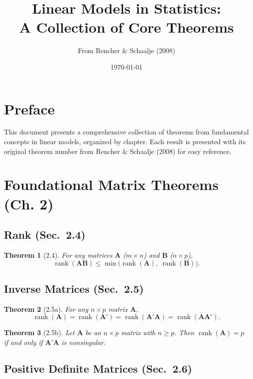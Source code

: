 \documentclass{article}
\title{Linear Models in Statistics: \\[0.5em] A Collection of Core Theorems}
\author{From Rencher \& Schaalje (2008)}
\date{\today}
\newtheorem{theorem}{Theorem}[section]
\begin{document}
\maketitle

\tableofcontents

\section*{Preface}
This document presents a comprehensive collection of theorems from fundamental concepts in linear models, organized by chapter. Each result is presented with its original theorem number from Rencher \& Schaalje (2008) for easy reference.

\newpage

\section{Foundational Matrix Theorems (Ch. 2)}

\subsection{Rank (Sec.\ 2.4)}

\begin{theorem}[2.4]
For any matrices $\mathbf{A}$ ($m \times n$) and $\mathbf{B}$ ($n \times p$),
\[
\operatorname{rank}(\mathbf{A}\mathbf{B}) \leq \min\bigl(\operatorname{rank}(\mathbf{A}),\; \operatorname{rank}(\mathbf{B})\bigr).
\]
\end{theorem}

\subsection{Inverse Matrices (Sec.\ 2.5)}

\begin{theorem}[2.5a]
For any $n \times p$ matrix $\mathbf{A}$,
\[
\operatorname{rank}(\mathbf{A}) = \operatorname{rank}(\mathbf{A}') = \operatorname{rank}(\mathbf{A}'\mathbf{A}) = \operatorname{rank}(\mathbf{A}\mathbf{A}').
\]
\end{theorem}

\begin{theorem}[2.5b]
Let $\mathbf{A}$ be an $n \times p$ matrix with $n \geq p$. Then $\operatorname{rank}(\mathbf{A}) = p$ if and only if $\mathbf{A}'\mathbf{A}$ is nonsingular.
\end{theorem}

\subsection{Positive Definite Matrices (Sec.\ 2.6)}
\end{document}
